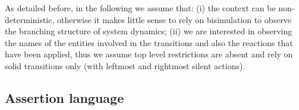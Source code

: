As detailed before, in the following we assume that: (i) the context can be non-deterministic, otherwise it makes little sense to rely on bisimulation to observe the branching structure of system dynamics; (ii) we are interested in observing the names of the entities involved in the transitions and also the reactions that have been applied, thus we assume top level restrictions are absent and rely on solid transitions only (with leftmost and rightmost silent actions).

\subsection{Assertion language}

%
%
%

